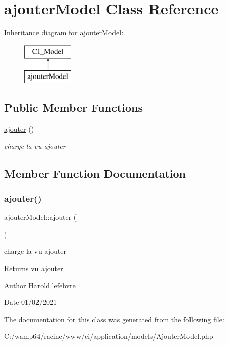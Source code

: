 \hypertarget{classajouter_model}{}\section{ajouter\+Model Class Reference}
\label{classajouter_model}
Inheritance diagram for ajouter\+Model\+:\begin{figure}[H]
\begin{center}
\leavevmode
\includegraphics[height=2.000000cm]{classajouter_model}
\end{center}
\end{figure}
\subsection*{Public Member Functions}
\begin{DoxyCompactItemize}
\item 
\mbox{\hyperlink{classajouter_model_acfe134d11b9b7815fbc50ec45c0f9fa4}{ajouter}} ()
\begin{DoxyCompactList}\small\item\em charge la vu ajouter \end{DoxyCompactList}\end{DoxyCompactItemize}


\subsection{Member Function Documentation}
\mbox{\label{classajouter_model_acfe134d11b9b7815fbc50ec45c0f9fa4}} 
\subsubsection{\texorpdfstring{ajouter()}{ajouter()}}
{\footnotesize\ttfamily ajouter\+Model\+::ajouter (\begin{DoxyParamCaption}{ }\end{DoxyParamCaption})}



charge la vu ajouter 

\begin{DoxyReturn}{Returns}
vu ajouter 
\end{DoxyReturn}
\begin{DoxyAuthor}{Author}
Harold lefebvre 
\end{DoxyAuthor}
\begin{DoxyDate}{Date}
01/02/2021 
\end{DoxyDate}


The documentation for this class was generated from the following file\+:\begin{DoxyCompactItemize}
\item 
C\+:/wamp64/racine/www/ci/application/models/Ajouter\+Model.\+php\end{DoxyCompactItemize}
